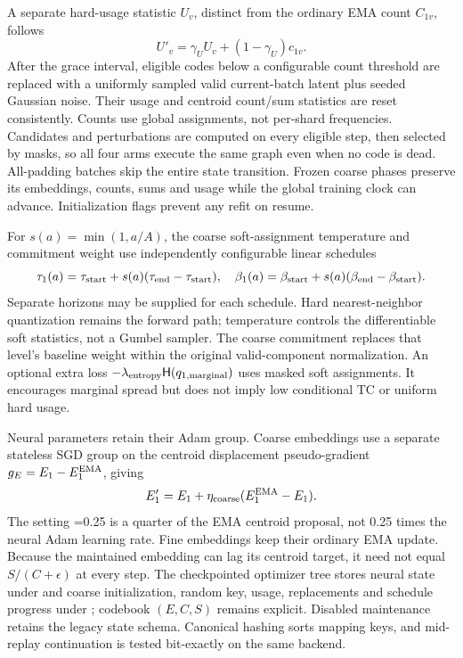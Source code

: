 \documentclass[11pt,a4paper]{article}
\begin{document}
A separate hard-usage statistic \(U_v\), distinct from the ordinary EMA count
\(C_{1v}\), follows
\begin{equation}
 U'_v=\gamma_U U_v+(1-\gamma_U)c_{1v}.
\end{equation}
After the grace interval, eligible codes below a configurable count threshold
are replaced with a uniformly sampled valid current-batch latent plus seeded
Gaussian noise. Their usage and centroid count/sum statistics are reset
consistently. Counts use global assignments, not per-shard frequencies.
Candidates and perturbations are computed on every eligible step, then selected
by masks, so all four arms execute the same graph even when no code is dead.
All-padding batches skip the entire state transition. Frozen coarse phases
preserve its embeddings, counts, sums and usage while the global training clock
can advance. Initialization flags prevent any refit on resume.

For \(s(a)=\min(1,a/A)\), the coarse soft-assignment temperature and commitment
weight use independently configurable linear schedules
\begin{equation}
 \tau_1(a)=\tau_{\rm start}+s(a)(\tau_{\rm end}-\tau_{\rm start}),\quad
 \beta_1(a)=\beta_{\rm start}+s(a)(\beta_{\rm end}-\beta_{\rm start}).
\end{equation}
Separate horizons may be supplied for each schedule. Hard nearest-neighbor
quantization remains the forward path; temperature controls the differentiable
soft statistics, not a Gumbel sampler. The coarse commitment replaces that
level's baseline weight within the original valid-component normalization.
An optional extra loss \(-\lambda_{\rm entropy}\mathsf H(q_{1,\rm marginal})\)
uses masked soft assignments. It encourages marginal spread but does not imply
low conditional TC or uniform hard usage.

Neural parameters retain their Adam group. Coarse embeddings use a separate
stateless SGD group on the centroid displacement pseudo-gradient
\(g_E=E_1-E_1^{\rm EMA}\), giving
\begin{equation}
 E'_1=E_1+\eta_{\rm coarse}(E_1^{\rm EMA}-E_1).
\end{equation}
The setting =0.25 is a quarter of the EMA
centroid proposal, not 0.25 times the neural Adam learning rate. Fine embeddings
keep their ordinary EMA update. Because the maintained embedding can lag its
centroid target, it need not equal \(S/(C+\epsilon)\) at every step.
The checkpointed optimizer tree stores neural state under  and
coarse initialization, random key, usage, replacements and schedule progress
under ; codebook \((E,C,S)\) remains explicit. Disabled maintenance
retains the legacy state schema. Canonical hashing sorts mapping keys, and
mid-replay continuation is tested bit-exactly on the same backend.
\end{document}
